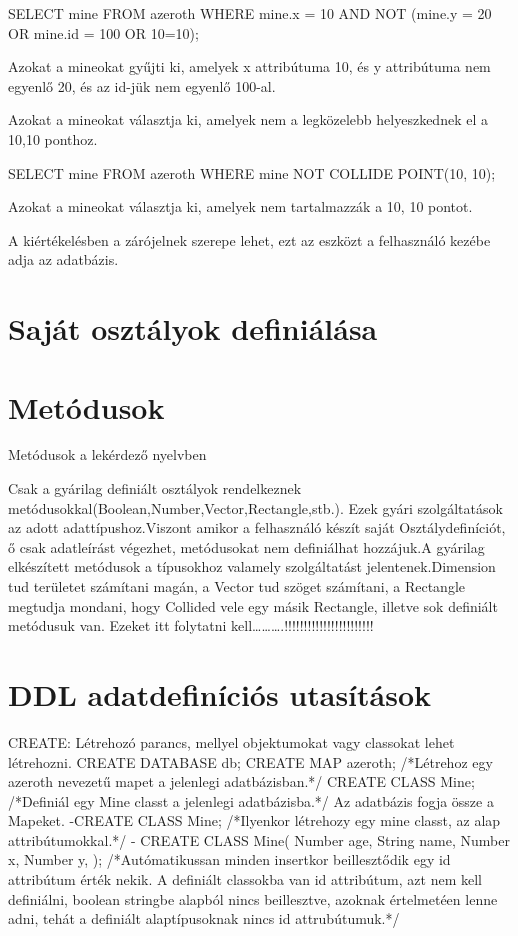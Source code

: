 \begin{sql}
SELECT mine FROM azeroth WHERE mine.x = 10 AND NOT (mine.y = 20 OR mine.id = 100 OR 10=10);
\end{sql}
Azokat a mineokat gyűjti ki, amelyek x attribútuma 10, és y attribútuma nem egyenlő 20, és az id-jük nem egyenlő 100-al.
\begin{sql}


Azokat a mineokat választja ki, amelyek nem a legközelebb helyeszkednek el a 10,10 ponthoz.
\begin{sql}
SELECT mine FROM azeroth WHERE mine NOT COLLIDE POINT(10, 10);
\end{sql}
Azokat a mineokat választja ki, amelyek nem tartalmazzák a 10, 10 pontot.


A kiértékelésben a zárójelnek szerepe lehet, ezt az eszközt a felhasználó kezébe adja az adatbázis.

\section{Saját osztályok definiálása}

\section{Metódusok}

Metódusok a lekérdező nyelvben

Csak a gyárilag definiált osztályok rendelkeznek metódusokkal(Boolean,Number,Vector,Rectangle,stb.).
Ezek gyári szolgáltatások az adott adattípushoz.Viszont amikor a felhasználó készít saját Osztálydefiníciót, ő csak adatleírást végezhet, metódusokat nem definiálhat hozzájuk.A gyárilag elkészített metódusok a típusokhoz valamely szolgáltatást jelentenek.Dimension tud területet számítani magán, a Vector tud szöget számítani, a Rectangle megtudja mondani, hogy Collided vele egy másik Rectangle, illetve sok definiált metódusuk van. Ezeket itt folytatni kell……….!!!!!!!!!!!!!!!!!!!!!!! 

\section{DDL adatdefiníciós utasítások}

CREATE: Létrehozó parancs, mellyel objektumokat vagy classokat lehet létrehozni.
CREATE DATABASE db;
CREATE MAP azeroth; /*Létrehoz egy azeroth nevezetű mapet a jelenlegi adatbázisban.*/
CREATE CLASS Mine; /*Definiál egy Mine classt a jelenlegi adatbázisba.*/
Az adatbázis fogja össze a Mapeket. 
-CREATE CLASS Mine; /*Ilyenkor létrehozy egy mine classt, az alap attribútumokkal.*/
- CREATE CLASS Mine(
	Number age,
	String name,
	Number x,
	Number y,
);  /*Autómatikussan minden insertkor beillesztődik egy id attribútum érték nekik. A definiált classokba van id attribútum, azt nem kell definiálni, boolean stringbe alapból nincs beillesztve, azoknak értelmetéen lenne adni, tehát a definiált alaptípusoknak nincs id attrubútumuk.*/


\end{sql}
